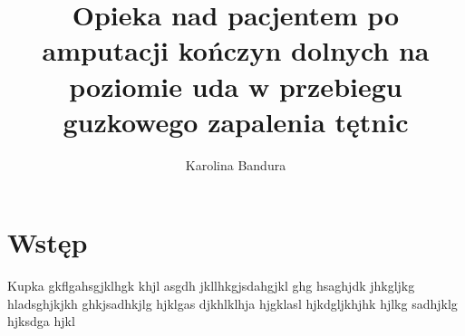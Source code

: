 \documentclass[10pt]{article}
\author{Karolina Bandura}
\title{Opieka nad pacjentem po amputacji kończyn dolnych na poziomie uda w przebiegu guzkowego zapalenia tętnic}
\begin{document}
\maketitle
\tableofcontents

\section{Wstęp}
Kupka gkflgahsgjklhgk khjl asgdh jkllhkgjsdahgjkl ghg hsaghjdk jhkgljkg hladsghjkjkh ghkjsadhkjlg hjklgas djkhlklhja hjgklasl hjkdgljkhjhk hjlkg sadhjklg hjksdga hjkl
\end{document}

